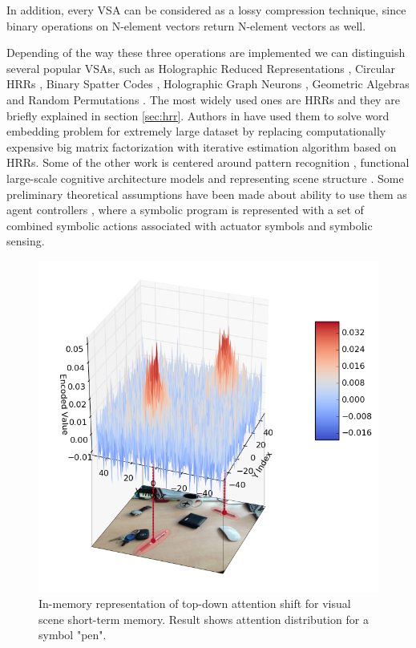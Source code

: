 \documentclass[conference]{IEEEtran}
\begin{document}
	In addition, every VSA can be considered as a lossy compression technique, since binary operations on N-element vectors return N-element vectors as well.
	
	Depending of the way these three operations are implemented we can distinguish several popular VSAs, such as Holographic Reduced Representations \cite{Plate:1995:HolographicReducedRepresentations}, Circular HRRs \cite{DeVine:2010:Semanticoscillations}, Binary Spatter Codes \cite{Kanerva:1994:SpatterCodeEncoding}, Holographic Graph Neurons \cite{Kleyko:2016:HolographicGraphNeuron}, Geometric Algebras \cite{Patyk-Lonska:2011:DistributedRepresentationsBased} and Random Permutations \cite{Recchia:2015:EncodingSequentialInformation}.
The most widely used ones are HRRs and they are briefly explained in section \ref{sec:hrr}.
Authors in \cite{Golosio:2015:CognitiveNeuralArchitecture} have used them to solve word embedding problem for extremely large dataset by replacing computationally expensive big matrix factorization with iterative estimation algorithm based on HRRs.
Some of the other work is centered around pattern recognition \cite{Kleyko:2016:PatternRecognitionVector}, functional large-scale cognitive architecture models \cite{Eliasmith:2012:LargeScaleModel} and representing scene structure \cite{scene-structure}.
Some preliminary theoretical assumptions have been made about ability to use them as agent controllers \cite{Levy:2013:LearningBehaviorHierarchies}, where a symbolic program is represented with a set of combined symbolic actions associated with actuator symbols and symbolic sensing.
	
	
	\begin{figure}
		\center
		\includegraphics[width=0.9\columnwidth]{img/probe_for_pen_w_img.png}
		\caption{In-memory representation of top-down attention shift for visual scene short-term memory. Result shows attention distribution for a symbol "pen".}
	\end{figure}
	
\end{document}
